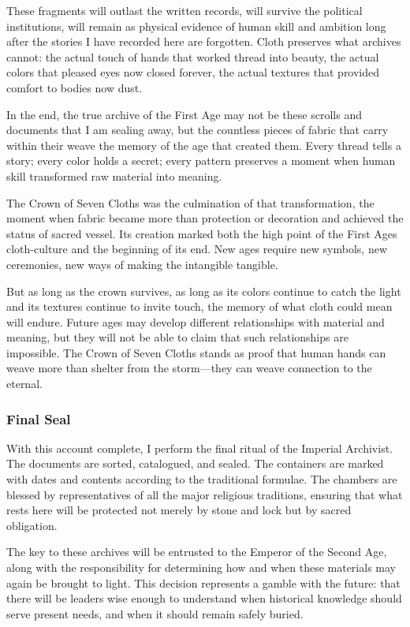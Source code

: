 These fragments will outlast the written records, will survive the
political institutions, will remain as physical evidence of human skill
and ambition long after the stories I have recorded here are forgotten.
Cloth preserves what archives cannot: the actual touch of hands that
worked thread into beauty, the actual colors that pleased eyes now
closed forever, the actual textures that provided comfort to bodies now
dust.

In the end, the true archive of the First Age may not be these scrolls
and documents that I am sealing away, but the countless pieces of fabric
that carry within their weave the memory of the age that created them.
Every thread tells a story; every color holds a secret; every pattern
preserves a moment when human skill transformed raw material into
meaning.

The Crown of Seven Cloths was the culmination of that transformation,
the moment when fabric became more than protection or decoration and
achieved the status of sacred vessel. Its creation marked both the high
point of the First Age\textquotesingle s cloth-culture and the beginning
of its end. New ages require new symbols, new ceremonies, new ways of
making the intangible tangible.

But as long as the crown survives, as long as its colors continue to
catch the light and its textures continue to invite touch, the memory of
what cloth could mean will endure. Future ages may develop different
relationships with material and meaning, but they will not be able to
claim that such relationships are impossible. The Crown of Seven Cloths
stands as proof that human hands can weave more than shelter from the
storm---they can weave connection to the eternal.

\subsubsection{Final Seal}\label{final-seal}

With this account complete, I perform the final ritual of the Imperial
Archivist. The documents are sorted, catalogued, and sealed. The
containers are marked with dates and contents according to the
traditional formulae. The chambers are blessed by representatives of all
the major religious traditions, ensuring that what rests here will be
protected not merely by stone and lock but by sacred obligation.

The key to these archives will be entrusted to the Emperor of the Second
Age, along with the responsibility for determining how and when these
materials may again be brought to light. This decision represents a
gamble with the future: that there will be leaders wise enough to
understand when historical knowledge should serve present needs, and
when it should remain safely buried.

